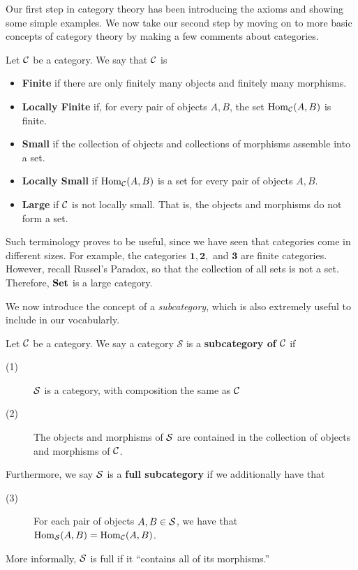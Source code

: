     Our first step in category theory has been introducing the axioms and showing 
    some simple examples. We now take our second step by moving on to more basic 
    concepts of category theory by making a few comments about categories. 

    \begin{definition}
        Let $\cc$ be a category. We say that $\cc$ is 
        \begin{itemize}
            \item \textbf{Finite} if there are only finitely many objects 
            and finitely many morphisms. 
            \item \textbf{Locally Finite} if, for every pair of objects 
            $A, B$, the set $\hom_{\cc}(A, B)$ is finite. 
            \item \textbf{Small} if the collection of objects and collections of morphisms 
            assemble into a set. 
            \item \textbf{Locally Small} if $\hom_{\cc}(A, B)$ is a set for every 
            pair of objects $A, B$. 
            \item \textbf{Large} if $\cc$ is not locally small. That is, the objects and 
            morphisms do not form a set. 
        \end{itemize}
    \end{definition}

    Such terminology proves to be useful, since we have seen that categories come in different sizes. 
    For example, the categories $\bm{1}, \bm{2},$ and $\bm{3}$ are finite categories.
    However, recall Russel's Paradox, so that the collection of all sets is not a set. 
    Therefore, $\Set$ is a large category.
    
    We now introduce the concept of a \emph{subcategory}, which is also extremely useful to include in our vocabularly. 
    \begin{definition}
        Let $\cc$ be a category. We say a category $\mathcal{S}$ is a \textbf{subcategory of $\cc$}
        if
        \begin{description}
            \item[(1)] $\ss$ is a category, with composition the same as $\cc$
            \item[(2)] The objects and morphisms of $\ss$ are contained in the collection of objects 
            and morphisms of $\cc$. 
        \end{description}
        Furthermore, we say $\ss$ is a \textbf{full subcategory} if we additionally have that 
        \begin{description}
            \item[(3)] For each pair of objects $A, B \in \ss$, we have that $\hom_{\ss}(A, B) = \hom_{\cc}(A, B)$.  
        \end{description}
        More informally, $\ss$ is full if it ``contains all of its morphisms.''
    \end{definition}

